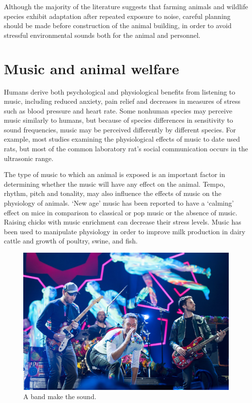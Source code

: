 \documentclass[]{book}
\begin{document}
Although the majority of the literature suggests that farming animals and wildlife species exhibit adaptation after repeated exposure to noise, careful planning should be made before construction of the animal building, in order to avoid stressful environmental sounds both for the animal and personnel.

\hypertarget{music-and-animal-welfare}{%
\section{Music and animal welfare}\label{music-and-animal-welfare}}

Humans derive both psychological and physiological benefits from listening to music, including reduced anxiety, pain relief and decreases in measures of stress such as blood pressure and heart rate. Some nonhuman species may perceive music similarly to humans, but because of species differences in sensitivity to sound frequencies, music may be perceived differently by different species. For example, most studies examining the physiological effects of music to date used rats, but most of the common laboratory rat's social communication occurs in the ultrasonic range.

The type of music to which an animal is exposed is an important factor in determining whether the music will have any effect on the animal. Tempo, rhythm, pitch and tonality, may also influence the effects of music on the physiology of animals. `New age' music has been reported to have a `calming' effect on mice in comparison to classical or pop music or the absence of music. Raising chicks with music enrichment can decrease their stress levels. Music has been used to manipulate physiology in order to improve milk production in dairy cattle and growth of poultry, swine, and fish.

\begin{figure}

{\centering \includegraphics[width=1\linewidth]{figures/coldplay} 

}

\caption{A band make the sound.}\label{fig:coldplay}
\end{figure}
\end{document}
